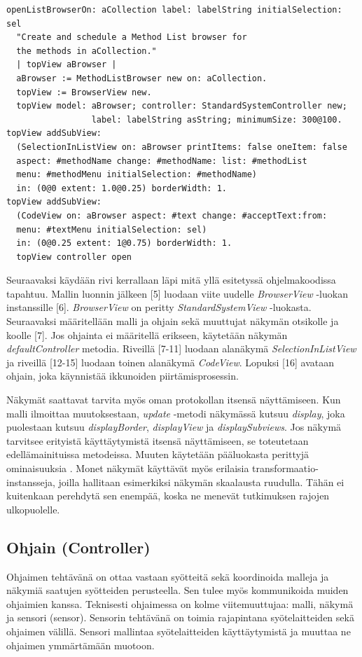 \documentclass[utf8]{gradu3}
\begin{document}
\begin{lstlisting}[language=Smalltalk]
openListBrowserOn: aCollection label: labelString initialSelection: sel
  "Create and schedule a Method List browser for 
  the methods in aCollection."
  | topView aBrowser | 
  aBrowser := MethodListBrowser new on: aCollection.
  topView := BrowserView new.
  topView model: aBrowser; controller: StandardSystemController new;
                 label: labelString asString; minimumSize: 300@100.
topView addSubView:
  (SelectionInListView on: aBrowser printItems: false oneItem: false
  aspect: #methodName change: #methodName: list: #methodList
  menu: #methodMenu initialSelection: #methodName)
  in: (0@0 extent: 1.0@0.25) borderWidth: 1.
topView addSubView:
  (CodeView on: aBrowser aspect: #text change: #acceptText:from:
  menu: #textMenu initialSelection: sel)
  in: (0@0.25 extent: 1@0.75) borderWidth: 1.
  topView controller open
\end{lstlisting}

Seuraavaksi käydään rivi kerrallaan läpi mitä yllä esitetyssä ohjelmakoodissa tapahtuu. Mallin luonnin jälkeen [5] luodaan viite uudelle \textit{BrowserView} -luokan instanssille [6]. \textit{BrowserView} on peritty \textit{StandardSystemView} -luokasta. Seuraavaksi määritellään malli ja ohjain sekä muuttujat näkymän otsikolle ja koolle [7]. Jos ohjainta ei määritellä erikseen, käytetään näkymän \textit{defaultController} metodia. Riveillä [7-11] luodaan alanäkymä \textit{SelectionInListView} ja riveillä [12-15] luodaan toinen alanäkymä \textit{CodeView}. Lopuksi [16] avataan ohjain, joka käynnistää ikkunoiden piirtämisprosessin.

Näkymät saattavat tarvita myös oman protokollan itsensä näyttämiseen. Kun malli ilmoittaa muutoksestaan, \textit{update} -metodi näkymässä kutsuu \textit{display}, joka puolestaan kutsuu \textit{displayBorder}, \textit{displayView} ja \textit{displaySubviews}. Jos näkymä tarvitsee erityistä käyttäytymistä itsensä näyttämiseen, se toteutetaan edellämainituissa metodeissa. Muuten käytetään pääluokasta perittyjä ominaisuuksia \parencite{burbeck}. Monet näkymät käyttävät myös erilaisia transformaatio-instansseja, joilla hallitaan esimerkiksi näkymän skaalausta ruudulla. Tähän ei kuitenkaan perehdytä sen enempää, koska ne menevät tutkimuksen rajojen ulkopuolelle.


\subsection{Ohjain (Controller)}
Ohjaimen tehtävänä on ottaa vastaan syötteitä sekä koordinoida malleja ja näkymiä saatujen syötteiden perusteella. Sen tulee myös kommunikoida muiden ohjaimien kanssa. Teknisesti ohjaimessa on kolme viitemuuttujaa: malli, näkymä ja sensori (sensor). Sensorin tehtävänä on toimia rajapintana syötelaitteiden sekä ohjaimen välillä. Sensori mallintaa syötelaitteiden käyttäytymistä ja muuttaa ne ohjaimen ymmärtämään muotoon.
\end{document}
